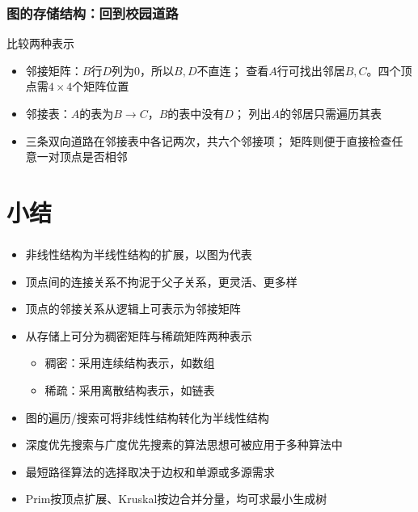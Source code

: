 


\begin{frame}
    \frametitle{图的存储结构：回到校园道路}
    \begin{exampleblock}{比较两种表示}
        \begin{itemize}
            \item 邻接矩阵：$B$行$D$列为$0$，所以$B,D$不直连；
                  查看$A$行可找出邻居$B,C$。四个顶点需$4\times4$个矩阵位置
            \item 邻接表：$A$的表为$B\rightarrow C$，$B$的表中没有$D$；
                  列出$A$的邻居只需遍历其表
            \item 三条双向道路在邻接表中各记两次，共六个邻接项；
                  矩阵则便于直接检查任意一对顶点是否相邻
        \end{itemize}
    \end{exampleblock}
\end{frame}





\section{小结}

\begin{frame}
    \frametitle{\insertsectionhead}
    \begin{itemize}
        \item 非线性结构为半线性结构的扩展，以图为代表
        \item 顶点间的连接关系不拘泥于父子关系，更灵活、更多样
        \item 顶点的邻接关系从\alert{逻辑上}可表示为\alert{邻接矩阵}
        \item 从\alert{存储上}可分为\alert{稠密}矩阵与\alert{稀疏}矩阵两种表示
              \begin{itemize}
                  \item 稠密：采用连续结构表示，如数组
                  \item 稀疏：采用离散结构表示，如链表
              \end{itemize}
        \item 图的遍历/搜索可将\alert{非}线性结构转化为\alert{半}线性结构
        \item 深度优先搜索与广度优先搜素的算法思想可被应用于多种算法中
        \item 最短路径算法的选择取决于边权和单源或多源需求
        \item Prim按顶点扩展、Kruskal按边合并分量，均可求最小生成树
    \end{itemize}
\end{frame}


